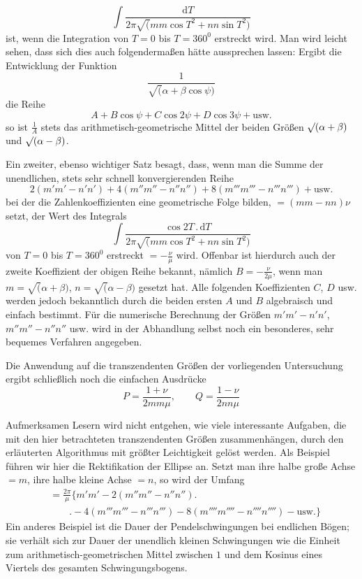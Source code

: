 \[
\int\frac{\mathrm{d}T}{2\pi\surd(mm\cos T^{2}+nn\sin T^{2})}
\]
ist, wenn die Integration von $T=0$ bis $T=360^{0}$ erstreckt wird. Man wird leicht sehen, dass sich dies auch folgendermaßen hätte aussprechen lassen: Ergibt die Entwicklung der Funktion
\[
\frac{1}{\surd(\alpha+\beta\cos\psi)}
\]
die Reihe
\[
A+B\cos\psi+C\cos2\psi+D\cos3\psi+\mathrm{usw.}
\]
so ist $\frac{1}{A}$ stets das arithmetisch-geometrische Mittel der beiden Größen $\surd(\alpha+\nobreak{}\beta)$ und $\surd(\alpha-\nobreak{}\beta)$.

Ein zweiter, ebenso wichtiger Satz besagt, dass, wenn man die Summe der unendlichen, stets sehr schnell konvergierenden Reihe
\[
2(m'm'-n'n')+4(m''m''-n''n'')+8(m'''m'''-n'''n''')+\mbox{usw.}
\]
bei der die Zahlenkoeffizienten eine geometrische Folge bilden, $=(mm-nn)\nu$ setzt, der Wert des Integrals
\[
\int\frac{\cos2T\,.\,\mathrm{d}T}
{2\pi\surd(mm\cos T^{2}+nn\sin T^{2})}
\]
von $T=0$ bis $T=360^{0}$ erstreckt $=-\frac{\nu}{\mu}$ wird. Offenbar ist hierdurch auch der zweite Koeffizient der obigen Reihe bekannt, nämlich $B=-\frac{\nu}{2\mu}$, wenn man $m=\surd(\alpha+\beta)$, $n=\surd(\alpha-\beta)$ gesetzt hat. Alle folgenden Koeffizienten $C$, $D$ usw. werden jedoch bekanntlich durch die beiden ersten $A$ und $B$ algebraisch und einfach bestimmt. Für die numerische Berechnung der Größen $m'm'-n'n'$, $m''m''-n''n''$ usw. wird in der Abhandlung selbst noch ein besonderes, sehr bequemes Verfahren angegeben.
\par
Die Anwendung auf die transzendenten Größen der vorliegenden Untersuchung ergibt schließlich noch die einfachen Ausdrücke
\[
P=\frac{1+\nu}{2mm\mu},\qquad Q=\frac{1-\nu}{2nn\mu}
\]
\par Aufmerksamen Lesern wird nicht entgehen, wie viele interessante Aufgaben, die mit den hier betrachteten transzendenten Größen zusammenhängen, durch den erläuterten Algorithmus mit größter Leichtigkeit gelöst werden. Als Beispiel führen wir hier die Rektifikation der Ellipse an. Setzt man ihre halbe große Achse $=m$, ihre halbe kleine Achse $=n$, so wird der Umfang
\[
\begin{aligned}&=\frac{2\pi}{\mu}\bigl\{m'm'-2(m''m''-n''n'')\bigr.\\[5pt]&\qquad\bigl.-4(m'''m'''-n'''n''')-8(m''''m''''-n''''n'''')-\mathrm{usw.}\bigr\}\end{aligned}
\]
Ein anderes Beispiel ist die Dauer der Pendelschwingungen bei endlichen Bögen; sie verhält sich zur Dauer der unendlich kleinen Schwingungen wie die Einheit zum arithmetisch-geometrischen Mittel zwischen $1$ und dem Kosinus eines Viertels des gesamten Schwingungsbogens.
